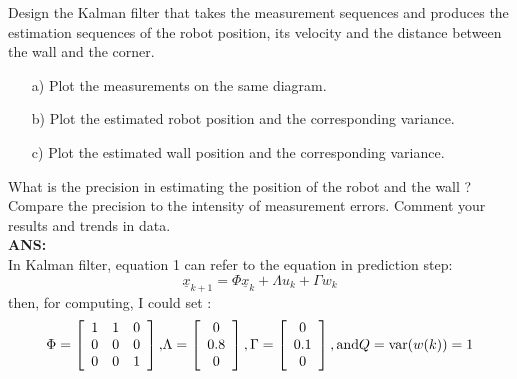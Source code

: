 \documentclass{article}
\begin{document}
Design the Kalman filter that takes the measurement sequences and produces the estimation sequences of the robot position, its velocity and the distance between the wall and the corner.
\begin{itemize}
\item[a)] Plot the measurements on the same diagram. 
\item[b)] Plot the estimated robot position and the corresponding variance. 
\item[c)] Plot the estimated wall position and the corresponding variance. 
\end{itemize}
What is the precision in estimating the position of the robot and the wall ?
Compare the precision to the intensity of measurement errors. Comment your
results and trends in data.\\
\textbf{ANS:}\\
In Kalman filter, equation 1 can refer to the equation in prediction step:
\begin{equation}
	\underline{x}_{k + 1}  = \Phi \underline{x}_k  + \Lambda u_k  + \Gamma w_k 
\end{equation}
then, for computing, I could set :
\begin{equation}
	\Phi  = \left[ {\begin{array}{*{20}c}
	   1 & 1 & 0  \\
	   0 & 0 & 0  \\
	   0 & 0 & 1  \\
	\end{array}} \right]{\rm{, }}\Lambda  = \left[ {\begin{array}{*{20}c}
	   0  \\
	   {0.8}  \\
	   0  \\
	\end{array}} \right],{\rm{ }}\Gamma  = \left[ {\begin{array}{*{20}c}
	   0  \\
	   {0.1}  \\
	   0  \\
	\end{array}} \right],{\rm{ and }}Q = {\mathop{\rm var}} (w(k)) = 1
\end{equation}
\end{document}
